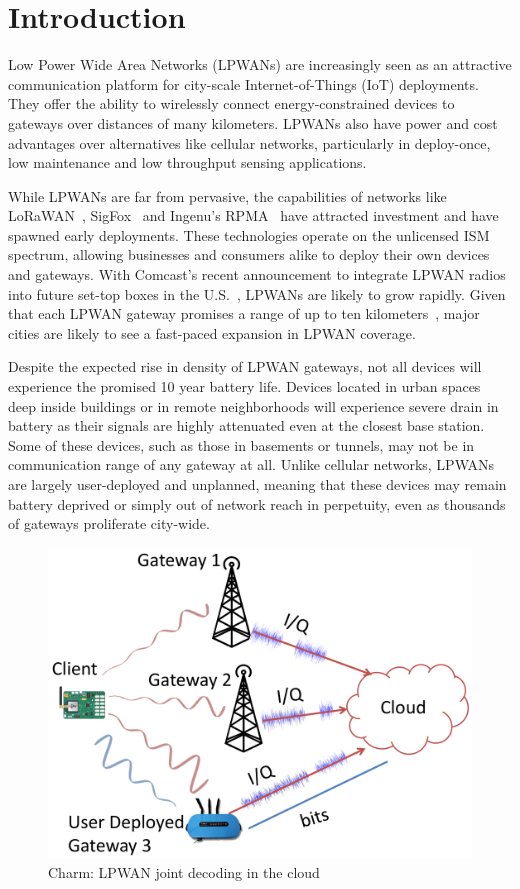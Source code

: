 
\section{Introduction}
\label{sec:intro}

Low Power Wide Area Networks (LPWANs) are increasingly seen as an attractive
communication platform for city-scale Internet-of-Things (IoT) deployments.
They offer the ability to wirelessly connect energy-constrained devices to
gateways over distances of many kilometers. LPWANs also have power and cost
advantages over alternatives like cellular networks, particularly in
deploy-once, low maintenance and low throughput sensing applications.

While LPWANs are far from pervasive, the capabilities of networks like
LoRaWAN~\cite{Sornin2015, LoRaWanAlliance2015}, SigFox~\cite{centenaro2016}
and Ingenu's RPMA~\cite{Ingenu2015} have attracted investment and have spawned
early deployments. These technologies operate on the unlicensed ISM spectrum,
allowing businesses and consumers alike to deploy their own devices and
gateways. With Comcast’s recent announcement to integrate LPWAN radios into
future set-top boxes in the U.S.~\cite{comcast2}, LPWANs are likely
to grow rapidly. Given that each LPWAN gateway promises a range of up to ten
kilometers~\cite{LoRaWanAlliance2015}, major cities are likely to see a
fast-paced expansion in LPWAN coverage.

Despite the expected rise in density of LPWAN gateways, not all devices will
experience the promised 10 year battery life. Devices located in urban spaces
deep inside buildings or in remote neighborhoods will experience severe drain
in battery as their signals are highly attenuated even at the closest base
station. Some of these devices, such as those in basements or tunnels, may not
be in communication range of any gateway at all. Unlike cellular networks,
LPWANs are largely user-deployed and unplanned, meaning that these devices may
remain battery deprived or simply out of network reach in perpetuity, even as
thousands of gateways proliferate city-wide.

\begin{figure}[tb]
    \centering
    \includegraphics[width=0.60\columnwidth]{figures/LoRaRAN_cropped}
    \vspace*{-10 pt}
    \caption{Charm: LPWAN joint decoding in the cloud}
    \compactimg
    \label{fig:my_label}
\end{figure}

